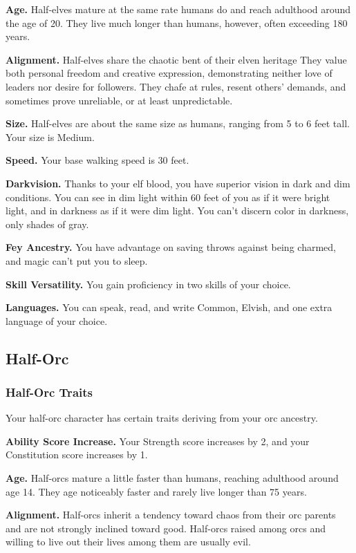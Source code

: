 \documentclass[
]{article}
\begin{document}
\textbf{Age.} Half-elves mature at the same rate humans do and reach
adulthood around the age of 20. They live much longer than humans,
however, often exceeding 180 years.

\textbf{Alignment.} Half-elves share the chaotic bent of their elven
heritage They value both personal freedom and creative expression,
demonstrating neither love of leaders nor desire for followers. They
chafe at rules, resent others' demands, and sometimes prove unreliable,
or at least unpredictable.

\textbf{Size.} Half-elves are about the same size as humans, ranging
from 5 to 6 feet tall. Your size is Medium.

\textbf{Speed.} Your base walking speed is 30 feet.

\textbf{Darkvision.} Thanks to your elf blood, you have superior vision
in dark and dim conditions. You can see in dim light within 60 feet of
you as if it were bright light, and in darkness as if it were dim light.
You can't discern color in darkness, only shades of gray.

\textbf{Fey Ancestry.} You have advantage on saving throws against being
charmed, and magic can't put you to sleep.

\textbf{Skill Versatility.} You gain proficiency in two skills of your
choice.

\textbf{Languages.} You can speak, read, and write Common, Elvish, and
one extra language of your choice.

\hypertarget{half-orc}{%
\subsection{Half-Orc}\label{half-orc}}

\hypertarget{half-orc-traits}{%
\subsubsection{Half-Orc Traits}\label{half-orc-traits}}

Your half-orc character has certain traits deriving from your orc
ancestry.

\textbf{Ability Score Increase.} Your Strength score increases by 2, and
your Constitution score increases by 1.

\textbf{Age.} Half-orcs mature a little faster than humans, reaching
adulthood around age 14. They age noticeably faster and rarely live
longer than 75 years.

\textbf{Alignment.} Half-orcs inherit a tendency toward chaos from their
orc parents and are not strongly inclined toward good. Half-orcs raised
among orcs and willing to live out their lives among them are usually
evil.
\end{document}

